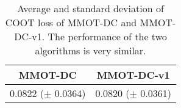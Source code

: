 \documentclass{article}
\begin{document}
\begin{table}[H]
  \label{tab:coot_new}
  \begin{center}
    \begin{small}
      \begin{sc}
        \begin{tabular}{|c|c|}
          \hline
          MMOT-DC & MMOT-DC-v1 \\
          \hline
          0.0822 ($\pm$ 0.0364) & 0.0820 ($\pm$ 0.0361) \\
          \hline
        \end{tabular}
      \end{sc}
    \end{small}
  \end{center}
  \caption{Average and standard deviation of COOT loss of MMOT-DC and MMOT-DC-v1. The performance of the two algorithms is 
  very similar.}
\end{table}







\end{document}
